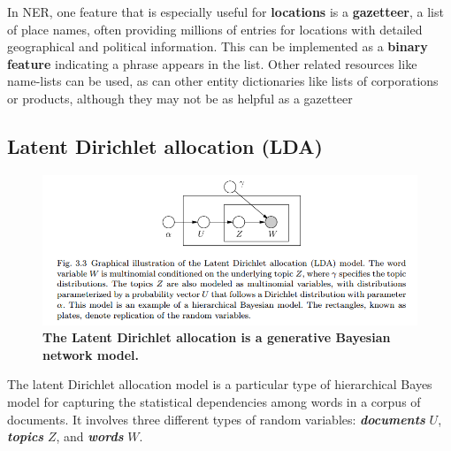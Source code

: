 \documentclass[11pt]{article}
\begin{document}
In NER, one feature that is especially useful for \textbf{locations} is a \textbf{gazetteer}, a list of place names, often providing millions of entries for locations with detailed geographical and political information. This can be implemented as a \textbf{binary feature} indicating a phrase appears in the list. Other related resources like name-lists can be used, as can other entity dictionaries like lists of corporations or products, although they may not be as helpful as a gazetteer

\subsection{Latent Dirichlet allocation (LDA)}
\begin{figure}
\begin{minipage}[t]{1\linewidth}
  \centering
  \centerline{\includegraphics[scale = 0.45]{lda.png}}
\end{minipage}
\caption{\footnotesize{\textbf{The Latent Dirichlet allocation is a generative Bayesian network model.}}}
\label{fig: lda}
\end{figure}
The latent Dirichlet allocation model \citep{wainwright2008graphical} is a particular type of hierarchical Bayes model for capturing the statistical dependencies among words in a corpus of documents. It involves three different types of random variables: \emph{\textbf{documents}} $U$, \emph{\textbf{topics}} $Z$, and \emph{\textbf{words}} $W$. 
\end{document}

